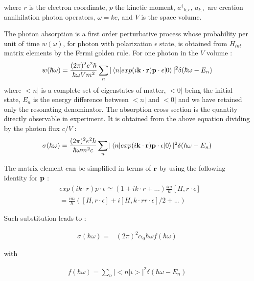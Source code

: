 \documentclass[a4paper,11pt]{report}
\begin{document}
where ${ r}$ is the electron coordinate, ${ p}$ the kinetic moment, ${  a^\dagger }_{ k,\epsilon}$, $a_{ k ,\epsilon}$ 
are creation annihilation photon operators, $\omega= kc $, and $V$ is the space volume.

The photon absorption is  a first  order perturbative process whose probability  per unit of time $w(\omega)$, 
for photon with polarization  $\epsilon$  state, 
is obtained from  $H_{int}$  matrix elements by the Fermi golden rule. For one photon in the $V$ volume :
\begin{equation}
  w(\hbar \omega) = \frac{(2 \pi)^2 e^2 \hbar }{\hbar \omega  V m^2 }  \sum_n  |\left< n |  exp(i { {\bf k} \cdot {\bf  r}} ) { {\bf  p} \cdot  {\bf \epsilon} } | 0 \right>|^2   \delta( \hbar \omega-E_n) 
\end{equation}
where $<n|$ is a complete set of eigenstates of matter, $<0|$  being the initial state, $ E_n$ is the energy difference between $<n|$ and $<0|$  and we have retained only the resonating denominator. 
The absorption cross section is the quantity directly observable in experiment. It is obtained from the above equation dividing by the photon flux  $c/V$ :
\begin{equation}
  \sigma(\hbar \omega) = \frac{(2 \pi)^2 e^2 \hbar }{\hbar \omega   m^2 c }  \sum_n  |\left< n |  exp(i { {\bf k} \cdot {\bf  r}} ) { {\bf  p} \cdot  {\bf \epsilon} } | 0 \right>|^2   \delta( \hbar \omega-E_n) 
\end{equation}

The matrix element can be simplified in terms of ${\bf r}$ by using the following identity for  ${\bf p}$  :
\begin{eqnarray}
 &exp(i {  k \cdot r} ) {  p \cdot  \epsilon }
\simeq ( 1 + i    k \cdot  r + ...  ) \frac{i m}{\hbar} [ H, {  r \cdot  \epsilon }]
 \\ 
& =
  \frac{i m}{\hbar} ([ H, {  r \cdot  \epsilon }] + i [ H, {  k \cdot r}  {  r \cdot  \epsilon }] /2 + ...) \label{expansion} \nonumber
\end{eqnarray} 

Such substitution leads to :

\begin{eqnarray}
  \sigma(\hbar \omega) =& (2 \pi)^2  \alpha_0   \hbar \omega    f(\hbar \omega)
\end{eqnarray}

with 

\begin{eqnarray}
  f(\hbar \omega)  =  \sum_n  | < n | i > |^2   \delta( \hbar \omega-E_n) \nonumber
\end{eqnarray}
\end{document}

